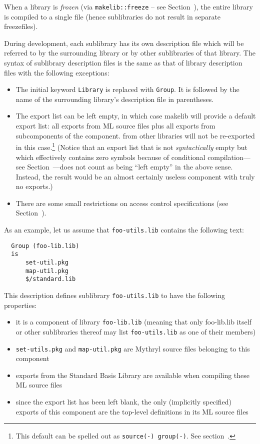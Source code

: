 When a library is {\em frozen} (via {\tt makelib::freeze} -- see
Section~), the entire library is compiled to a single
file (hence sublibraries do not result in separate freezefiles).

During development, each sublibrary has its own description file which will
be referred to by the surrounding library or by other sublibraries of that
library. The syntax of sublibrary description files is the same as that of
library description files with the following exceptions:

\begin{itemize}
\item The initial keyword {\tt Library} is replaced with {\tt Group}.
It is followed by the name of the surrounding library's description
file in parentheses.
\item The export list can be left empty, in which case makelib will provide
a default export list: all exports from ML source files plus all
exports from subcomponents of the component. from other libraries will
not be re-exported in this case.\footnote{This default can be spelled
out as {\tt source(-) group(-)}.  See
section~.}  (Notice that an export list that
is not {\em syntactically} empty but which effectively contains zero
symbols because of conditional compilation---see
Section~---does not count as being ``left empty'' in
the above sense.  Instead, the result would be an almost certainly
useless component with truly no exports.)
\item There are some small restrictions on access control
specifications (see Section~).
\end{itemize}

As an example, let us assume that
{\tt foo-utils.lib} contains the following text:

\begin{verbatim}
  Group (foo-lib.lib)
  is
      set-util.pkg
      map-util.pkg
      $/standard.lib
\end{verbatim}

This description defines sublibrary {\tt foo-utils.lib} to have the
following properties:

\begin{itemize}
\item it is a component of library {\tt foo-lib.lib} (meaning that only
foo-lib.lib itself or other sublibraries thereof may list {\tt foo-utils.lib} as one
of their members)
\item {\tt set-utils.pkg} and {\tt map-util.pkg} are Mythryl source files
belonging to this component
\item exports from the Standard Basis Library are available when
compiling these ML source files
\item since the export list has been left blank, the only (implicitly
specified) exports of this component are the top-level definitions in
its ML source files
\end{itemize}

